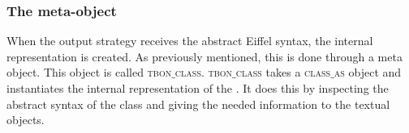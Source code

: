 \subsubsection{The meta-object}
\label{tbon_class}
When the output strategy receives the abstract Eiffel syntax, the internal \bon{} representation is created. As previously mentioned, this is done through a meta object. This object is called \textsc{tbon$\_$class}. \textsc{tbon$\_$class} takes a \textsc{class$\_$as} object and instantiates the internal representation of the \bon{}. It does this by inspecting the abstract syntax of the class and giving the needed information to the textual \bon{} objects.
